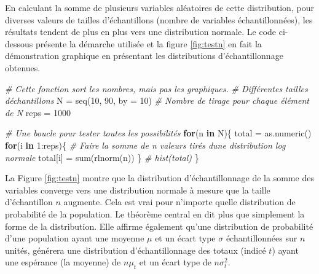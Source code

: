 \documentclass[
]{book}
\newenvironment{Shaded}{}{}
\newcommand{\AttributeTok}[1]{#1}
\newcommand{\CommentTok}[1]{\textit{#1}}
\newcommand{\ControlFlowTok}[1]{\textbf{#1}}
\newcommand{\DecValTok}[1]{#1}
\newcommand{\FunctionTok}[1]{#1}
\newcommand{\NormalTok}[1]{#1}
\newcommand{\OtherTok}[1]{#1}
\newcommand{\SpecialCharTok}[1]{#1}
\begin{document}
En calculant la somme de plusieurs variables aléatoires de cette distribution, pour diverses valeurs de tailles d'échantillons (nombre de variables échantillonnées), les résultats tendent de plus en plus vers une distribution normale. Le code ci-dessous présente la démarche utilisée et la figure \ref{fig:testn} en fait la démonstration graphique en présentant les distributions d'échantillonnage obtenues.

\begin{Shaded}
\begin{Highlighting}[]
\CommentTok{\# Cette fonction sort les nombres, mais pas les graphiques.}
\CommentTok{\# Différentes tailles d\textquotesingle{}échantillons}
\NormalTok{N }\OtherTok{=} \FunctionTok{seq}\NormalTok{(}\DecValTok{10}\NormalTok{, }\DecValTok{90}\NormalTok{, }\AttributeTok{by =} \DecValTok{10}\NormalTok{)}
\CommentTok{\# Nombre de tirage pour chaque élément de N}
\NormalTok{reps }\OtherTok{=} \DecValTok{1000}

\CommentTok{\# Une boucle pour tester toutes les possibilités}
\ControlFlowTok{for}\NormalTok{(n }\ControlFlowTok{in}\NormalTok{ N)\{}
\NormalTok{  total }\OtherTok{=} \FunctionTok{as.numeric}\NormalTok{()}
  \ControlFlowTok{for}\NormalTok{(i }\ControlFlowTok{in} \DecValTok{1}\SpecialCharTok{:}\NormalTok{reps)\{}
    \CommentTok{\# Faire la somme de n valeurs tirés d\textquotesingle{}une distribution log normale}
\NormalTok{    total[i] }\OtherTok{=} \FunctionTok{sum}\NormalTok{(}\FunctionTok{rlnorm}\NormalTok{(n))}
\NormalTok{  \}}
  \CommentTok{\# hist(total) }
\NormalTok{\}}
\end{Highlighting}
\end{Shaded}

La Figure \ref{fig:testn} montre que la distribution d'échantillonnage de la somme des variables converge vers une distribution normale à mesure que la taille d'échantillon \(n\) augmente. Cela est vrai pour n'importe quelle distribution de probabilité de la population. Le théorème central en dit plus que simplement la forme de la distribution. Elle affirme également qu'une distribution de probabilité d'une population ayant une moyenne \(\mu\) et un écart type \(\sigma\) échantillonnées sur \(n\) unités, générera une distribution d'échantillonnage des totaux (indicé \(t\)) ayant une espérance (la moyenne) de \(n\mu_t\) et un écart type de \(n\sigma_t^2\).
\end{document}
